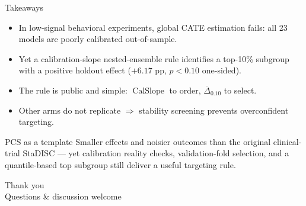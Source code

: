 \documentclass[aspectratio=169,11pt]{beamer}
\newcommand{\CalSlope}{\ensuremath{\operatorname{CalSlope}}}
\newcommand{\MeanDeltaTopTen}{\ensuremath{\overline{\Delta}_{0.10}}}
\begin{document}
\begin{frame}{Takeaways}
\begin{itemize}
  \item In low-signal behavioral experiments, \alert{global CATE estimation fails}: all 23 models are poorly calibrated out-of-sample.
  \item Yet a \alert{calibration-slope nested-ensemble} rule identifies a top-10\% subgroup with a \alert{positive holdout effect} ($+6.17$ pp, $p<0.10$ one-sided).
  \item The rule is public and simple: $\CalSlope$ to order, $\MeanDeltaTopTen$ to select.
  \item Other arms do not replicate $\Rightarrow$ stability screening prevents overconfident targeting.
\end{itemize}

\vspace{0.3em}
\begin{block}{PCS as a template}
Smaller effects and noisier outcomes than the original clinical-trial StaDISC — yet calibration reality checks, validation-fold selection, and a quantile-based top subgroup still deliver a useful targeting rule.
\end{block}
\end{frame}

\begin{frame}[standout]
Thank you \\[0.3em]
\normalsize Questions \& discussion welcome
\end{frame}
\end{document}
